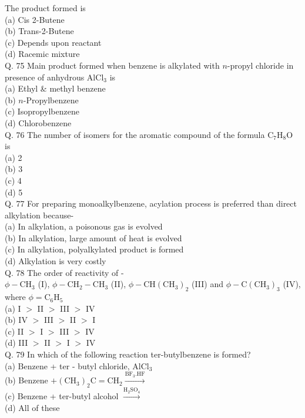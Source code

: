 \documentclass[10pt]{article}
\begin{document}
The product formed is\\
(a) Cis 2-Butene\\
(b) Trans-2-Butene\\
(c) Depends upon reactant\\
(d) Racemic mixture\\
Q. 75 Main product formed when benzene is alkylated with $n$-propyl chloride in presence of anhydrous $\mathrm{AlCl}_{3}$ is\\
(a) Ethyl \& methyl benzene\\
(b) $n$-Propylbenzene\\
(c) Isopropylbenzene\\
(d) Chlorobenzene\\
Q. 76 The number of isomers for the aromatic compound of the formula $\mathrm{C}_{7} \mathrm{H}_{8} \mathrm{O}$ is\\
(a) 2\\
(b) 3\\
(c) 4\\
(d) 5\\
Q. 77 For preparing monoalkylbenzene, acylation process is preferred than direct alkylation because-\\
(a) In alkylation, a poisonous gas is evolved\\
(b) In alkylation, large amount of heat is evolved\\
(c) In alkylation, polyalkylated product is formed\\
(d) Alkylation is very costly\\
Q. 78 The order of reactivity of -\\
$\phi-\mathrm{CH}_{3}$ (I), $\phi-\mathrm{CH}_{2}-\mathrm{CH}_{3}$ (II), $\phi-\mathrm{CH}\left(\mathrm{CH}_{3}\right)_{2}$ (III) and $\phi-\mathrm{C}\left(\mathrm{CH}_{3}\right)_{3}$ (IV), where $\phi=\mathrm{C}_{6} \mathrm{H}_{5}$\\
(a) I $>$ II $>$ III $>$ IV\\
(b) IV $>$ III $>$ II $>$ I\\
(c) II $>$ I $>$ III $>$ IV\\
(d) III $>$ II $>$ I $>$ IV\\
Q. 79 In which of the following reaction ter-butylbenzene is formed?\\
(a) Benzene + ter - butyl chloride, $\mathrm{AlCl}_{3}$\\
(b) Benzene $+\left(\mathrm{CH}_{3}\right)_{2} \mathrm{C}=\mathrm{CH}_{2} \xrightarrow{\mathrm{BF}_{3} . \mathrm{HF}}$\\
(c) Benzene + ter-butyl alcohol $\xrightarrow{\mathrm{H}_{2} \mathrm{SO}_{4}}$\\
(d) All of these
\end{document}
